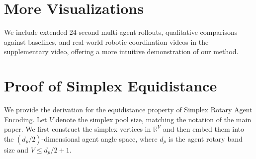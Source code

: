 \section{More Visualizations}
We include extended 24-second multi-agent rollouts, qualitative comparisons against baselines, and real-world robotic coordination videos in the supplementary video, offering a more intuitive demonstration of our method.

\section{Proof of Simplex Equidistance}
\label{app:simplex-equidistance}

We provide the derivation for the equidistance property of Simplex Rotary Agent Encoding. 
Let $V$ denote the simplex pool size, matching the notation of the main paper.
We first construct the simplex vertices in $\mathbb{R}^{V}$ and then embed them into the $(d_p/2)$-dimensional agent angle space, where $d_p$ is the agent rotary band size and $V\leq d_p/2+1$.

